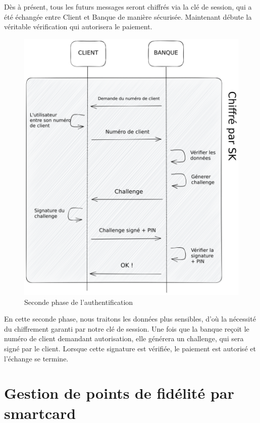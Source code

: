 Dès à présent, tous les futurs messages seront chiffrés via la clé de session, qui a été échangée entre
Client et Banque de manière sécurisée. Maintenant débute la véritable vérification qui autorisera le
paiement.

\begin{figure}[H]
    \centering
    \includegraphics[scale=.5]{img/andrea-fig-2.png}
    \caption{Seconde phase de l'authentification}
    \label{fig:smartcard-exchange02}
\end{figure}

En cette seconde phase, nous traitons les données plus sensibles, d'où la nécessité du chiffrement
garanti par notre clé de session. Une fois que la banque reçoit le numéro de client demandant
autorisation, elle générera un challenge, qui sera signé par le client. Lorsque cette signature est
vérifiée, le paiement est autorisé et l'échange se termine.

\section{Gestion de points de fidélité par smartcard}

